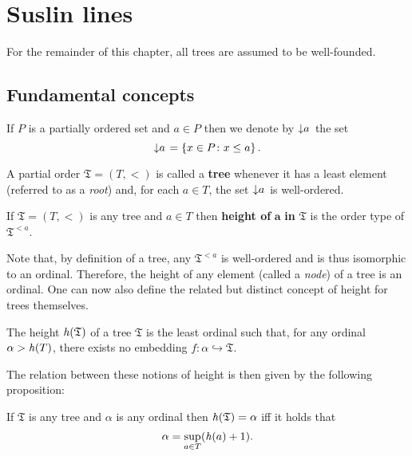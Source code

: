 
\chapter{Suslin lines}

\begin{assn}
	For the remainder of this chapter, all trees are assumed to be well-founded.
\end{assn}


\section{Fundamental concepts}

\begin{dfn}
	If $P$ is a partially ordered set and $a\in P$ then we denote by $\left\downarrow a\right.$ the set
	\begin{equation}
		\left\downarrow a\right.=\left\lbrace x\in P\colon x\leq a \right\rbrace.
	\end{equation}
\end{dfn}

\begin{dfn}[Tree]
	A partial order $\mathfrak{T}=(T,<)$ is called a \textbf{tree} whenever it has a least element (referred to as a \textit{root}) and, for each $a\in T$, the set $\left\downarrow a\right.$ is well-ordered.
\end{dfn}

\begin{dfn}[Height]
	If $\mathfrak{T}=(T,<)$ is any tree and $a\in T$ then \textbf{height of }$\mathbf{a}$\textbf{ in }$\bm{\mathfrak{T}}$ is the order type of $\mathfrak{T}^{<a}$.
\end{dfn}

Note that, by definition of a tree, any $\mathfrak{T}^{<a}$ is well-ordered and is thus isomorphic to an ordinal.  Therefore, the height of any element (called a \textit{node}) of a tree is an ordinal.  One can now also define the related but distinct concept of height for trees themselves.

\begin{dfn}
	The height $\mathit{h}(\mathfrak{T})$ of a tree $\mathfrak{T}$ is the least ordinal such that, for any ordinal $\alpha>\mathit{h}(T)$, there exists no embedding $f\colon\alpha\hookrightarrow\mathfrak{T}$.
\end{dfn}

The relation between these notions of height is then given by the following proposition:

\begin{prp}
	If $\mathfrak{T}$ is any tree and $\alpha$ is any ordinal then $\mathit{h}(\mathfrak{T})=\alpha$ iff it holds that
	\begin{equation}
		\alpha=\sup_{a\in T}(\mathit{h}(a)+1).
	\end{equation}
\end{prp}

